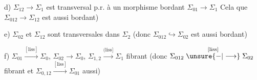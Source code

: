 d) $\Sigma_{12}\longrightarrow\Sigma_1$ est transversal p.r. à
un morphisme bordant $\Sigma_{01}\longrightarrow\Sigma_1$ Cela  que
$\Sigma_{012}\longrightarrow\Sigma_{12}$ est aussi bordant)

e) $\Sigma_{02}$ et $\Sigma_{12}$ sont  transversales dans $\Sigma_2$
(donc $\Sigma_{012}\hookrightarrow\Sigma_{02}$ est aussi bordant)

f) $\Sigma_{01}\xrightarrow{[\mathrm{liss}]}\Sigma_0$, $\Sigma_{02}\longrightarrow\Sigma_0$, $\Sigma_{1,2}\xrightarrow{(\mathrm{liss}]}\Sigma_1$ fibrant
(donc $\Sigma_{012}\overset{[\mathrm{liss}]}{\mathrel{\unsure{-|\longrightarrow}}}\Sigma_{02}$ fibrant  et $\Sigma_{0,12}\xrightarrow{[\mathrm{liss}]}\Sigma_{01}$ aussi)



